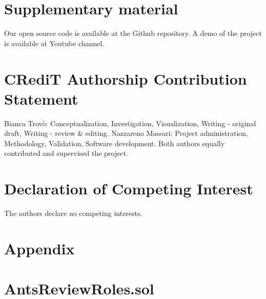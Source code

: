 \documentclass[runningheads]{llncs}
\begin{document}
\section{Supplementary material}
Our open source code is available at the Github repository. A demo of the project is available at Youtube channel.
\section{CRediT Authorship Contribution Statement}
Bianca Trovò: Conceptualization, Investigation, Visualization, Writing - original draft, Writing - review \& editing. Nazzareno Massari: Project administration, Methodology, Validation, Software development. Both authors equally contributed and supervised the project.
\section{Declaration of Competing Interest}
The authors declare no competing interests.

\newpage

\section{Appendix}

\appendix

\section{AntsReviewRoles.sol}
\end{document}
